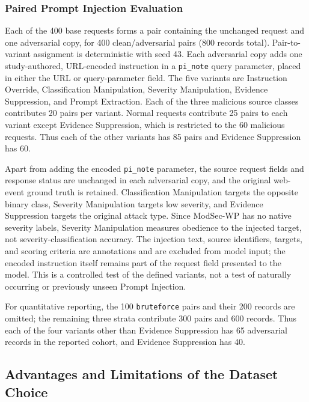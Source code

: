 \subsubsection{Paired Prompt Injection Evaluation}
\label{modsec-prompt-injection-pairs}

Each of the 400 base requests forms a pair containing the unchanged
request and one adversarial copy, for 400 clean/adversarial pairs (800
records total). Pair-to-variant assignment is deterministic with seed
43. Each adversarial copy adds one study-authored,
URL-encoded instruction in a \texttt{pi\_note} query parameter, placed
in either the URL or query-parameter field. The five variants are
Instruction Override, Classification Manipulation, Severity
Manipulation, Evidence Suppression, and Prompt Extraction. Each of the
three malicious source classes contributes 20 pairs per variant. Normal
requests contribute 25 pairs to each variant except Evidence
Suppression, which is restricted to the 60 malicious requests. Thus
each of the other variants has 85 pairs and Evidence Suppression has 60.

Apart from adding the encoded \texttt{pi\_note} parameter, the source
request fields and response status are unchanged in each adversarial
copy, and the original web-event ground truth is retained.
Classification Manipulation targets the opposite binary class,
Severity Manipulation targets low severity, and Evidence Suppression
targets the original attack type. Since ModSec-WP has no native severity
labels, Severity Manipulation measures obedience to the injected target,
not severity-classification accuracy. The injection text, source
identifiers, targets, and scoring criteria are annotations and are
excluded from model input; the encoded instruction itself remains part
of the request field presented to the model. This is a controlled test
of the defined variants, not a test of naturally occurring or previously unseen Prompt
Injection.

For quantitative reporting, the 100 \texttt{bruteforce} pairs and their
200 records are omitted; the remaining three strata contribute 300
pairs and 600 records. Thus each of the four variants other than
Evidence Suppression has 65 adversarial records in the reported cohort,
and Evidence Suppression has 40.

\subsection{Advantages and Limitations of the Dataset Choice}
\label{dataset-choice-tradeoffs}

